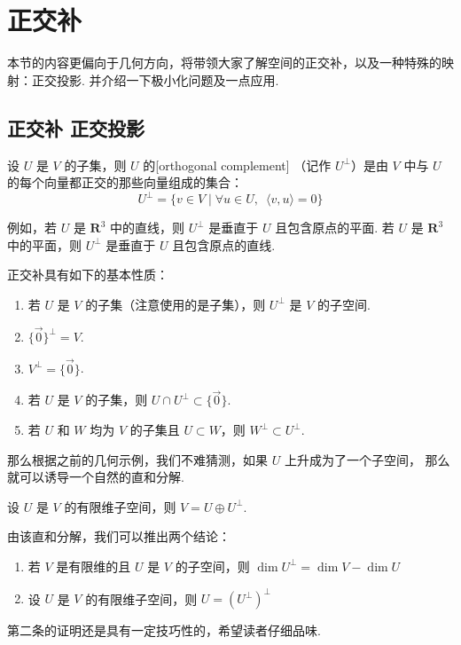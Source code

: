 \section{正交补}

本节的内容更偏向于几何方向，将带领大家了解空间的正交补，以及一种特殊的映射：正交投影.
并介绍一下极小化问题及一点应用.

\subsection{正交补 \quad 正交投影}

\begin{definition}
    设 $ U $ 是 $ V $ 的子集，则 $ U $ 的[orthogonal complement]
    （记作 $ U^{\perp } $）是由 $ V $ 中与 $ U $ 的每个向量都正交的那些向量组成的集合：
    \[U^{\perp } = \{ v \in V \mid \forall u \in U, \enspace \langle v, u\rangle = 0\}\]
\end{definition}

例如，若 $ U $ 是 $ \mathbf{R}^{3} $ 中的直线，则 $ U^{\perp } $ 是垂直于 $ U $ 且包含原点的平面.
若 $ U $ 是 $ \mathbf{R}^{3} $ 中的平面，则 $ U^{\perp } $ 是垂直于 $ U $ 且包含原点的直线.

正交补具有如下的基本性质：
\begin{enumerate}
    \item 若 $ U $ 是 $ V $ 的子集（注意使用的是子集），则 $ U^{\perp }$ 是 $ V $ 的子空间.

    \item $ \{ \vec{0} \}^{\perp } = V $.

    \item $ V^{\perp } = \{ \vec{0} \} $.

    \item 若 $ U $ 是 $ V $ 的子集，则 $ U \cap U^{\perp } \subset \{ \vec{0} \}$.

    \item 若 $ U $ 和 $ W $ 均为 $ V $ 的子集且 $ U \subset W $，则 $ W^{\perp } \subset U^{\perp }$.
\end{enumerate}

那么根据之前的几何示例，我们不难猜测，如果 $ U $ 上升成为了一个子空间，
那么就可以诱导一个自然的直和分解.

\begin{theorem}
    设 $ U $ 是 $ V $ 的有限维子空间，则 $ V = U \oplus U^{\perp } $.
\end{theorem}

由该直和分解，我们可以推出两个结论：
\begin{enumerate}
    \item 若 $ V $ 是有限维的且 $ U $ 是 $ V $ 的子空间，则
          $ \dim U^{\perp }= \dim V - \dim U$

    \item 设 $ U $ 是 $ V $ 的有限维子空间，则 $ U = (U^{\perp})^{\perp} $
\end{enumerate}
第二条的证明还是具有一定技巧性的，希望读者仔细品味.

